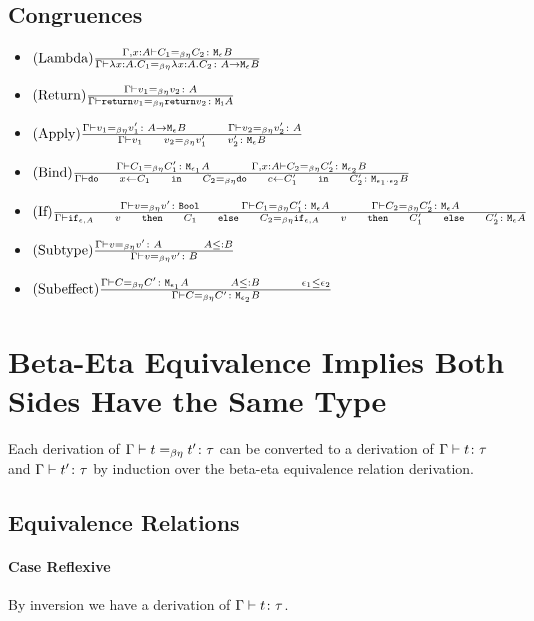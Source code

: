 \documentclass{report}
\begin{document}
    \subsection{Congruences}
    \begin{itemize}
        \item $(\text{Lambda}) \frac{\Gamma, x: A \vdash C_1 =_{\beta\eta} C_2 \colon \texttt{M}_{\epsilon}{B}}{\Gamma \vdash \lambda x : A. C_1 =_{\beta\eta} \lambda x : A. C_2 \colon A \rightarrow \texttt{M}_{\epsilon}{B}}$
        
        \item $(\text{Return}) \frac{\Gamma \vdash v_1 =_{\beta\eta} v_2 \colon A}{\Gamma \vdash \texttt{return} v_1 =_{\beta\eta} \texttt{return} v_2 \colon \texttt{M}_{\texttt{1}}{A}}$
        
        \item $\treerule{Apply}{\gberelation{v_1}{v_1'}{\lamtype{A}{\e}{B}}\s\s\gberelation{v_2}{v_2'}{A}}{\gberelation{\apply{v_1}{v_2}}{\apply{v_1'}{v_2'}}{\meb}}$
        
        \item $\treerule{Bind}{\gberelation{C_1}{C_1'}{\M{\e_1}{A}} \s\s \berelation{\gax}{C_2}{C_2'}{\M{\e_2}{B}}}{\gberelation{\doin{x}{C_1}{C_2}}{\doin{c}{C_1'}{C_2'}}{\M{\e_1 \dot \e_2}{B}}}$
        
        \item $\treerule{If}{\gberelation{v}{v'}{\B} \s\s \gberelation{C_1}{C_1'}{\mea}\s\s\gberelation{C_2}{C_2'}{\mea}}{\gberelation{\ifthenelse{\e}{A}{v}{C_1}{C_2}}{\ifthenelse{\e}{A}{v}{C_1'}{C_2'}}{\mea}}$
        \item $\treerule{Subtype}{\gberelation{v}{v'}{A} \s\s A \subtype B}{\gberelation{v}{v'}{B}}$
        \item $\treerule{Subeffect}{\gberelation{C}{C'}{\M{\e_1}{A}}\s\s A \subtype B \s\s \e_1 \subeffect \e_2}{\gberelation{C}{C'}{\M{\e_2}{B}}}$
    \end{itemize}
    \section{Beta-Eta Equivalence Implies Both Sides Have the Same Type}
    Each derivation of $\Gamma \vdash t =_{\beta\eta} t' \colon \tau$ can be converted to a derivation of $\Gamma \vdash t \colon \tau$ and $\Gamma \vdash t' \colon \tau$ by induction over the beta-eta equivalence relation derivation.

    \subsection{Equivalence Relations}
    \paragraph{Case Reflexive}
    By inversion we have a derivation of $\Gamma \vdash t \colon \tau$.
\end{document}
